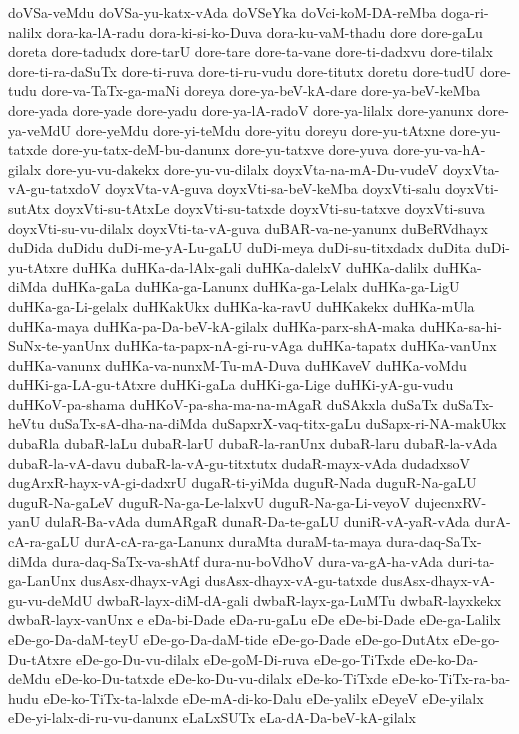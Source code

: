 {doVSa-veMdu
doVSa-yu-katx-vAda
doVSeYka
doVci-koM-DA-reMba
doga-ri-nalilx
dora-ka-lA-radu
dora-ki-si-ko-Duva
dora-ku-vaM-thadu
dore
dore-gaLu
doreta
dore-tadudx
dore-tarU
dore-tare
dore-ta-vane
dore-ti-dadxvu
dore-tilalx
dore-ti-ra-daSuTx
dore-ti-ruva
dore-ti-ru-vudu
dore-titutx
doretu
dore-tudU
dore-tudu
dore-va-TaTx-ga-maNi
doreya
dore-ya-beV-kA-dare
dore-ya-beV-keMba
dore-yada
dore-yade
dore-yadu
dore-ya-lA-radoV
dore-ya-lilalx
dore-yanunx
dore-ya-veMdU
dore-yeMdu
dore-yi-teMdu
dore-yitu
doreyu
dore-yu-tAtxne
dore-yu-tatxde
dore-yu-tatx-deM-bu-danunx
dore-yu-tatxve
dore-yuva
dore-yu-va-hA-gilalx
dore-yu-vu-dakekx
dore-yu-vu-dilalx
doyxVta-na-mA-Du-vudeV
doyxVta-vA-gu-tatxdoV
doyxVta-vA-guva
doyxVti-sa-beV-keMba
doyxVti-salu
doyxVti-sutAtx
doyxVti-su-tAtxLe
doyxVti-su-tatxde
doyxVti-su-tatxve
doyxVti-suva
doyxVti-su-vu-dilalx
doyxVti-ta-vA-guva
duBAR-va-ne-yanunx
duBeRVdhayx
duDida
duDidu
duDi-me-yA-Lu-gaLU
duDi-meya
duDi-su-titxdadx
duDita
duDi-yu-tAtxre
duHKa
duHKa-da-lAlx-gali
duHKa-dalelxV
duHKa-dalilx
duHKa-diMda
duHKa-gaLa
duHKa-ga-Lanunx
duHKa-ga-Lelalx
duHKa-ga-LigU
duHKa-ga-Li-gelalx
duHKakUkx
duHKa-ka-ravU
duHKakekx
duHKa-mUla
duHKa-maya
duHKa-pa-Da-beV-kA-gilalx
duHKa-parx-shA-maka
duHKa-sa-hi-SuNx-te-yanUnx
duHKa-ta-papx-nA-gi-ru-vAga
duHKa-tapatx
duHKa-vanUnx
duHKa-vanunx
duHKa-va-nunxM-Tu-mA-Duva
duHKaveV
duHKa-voMdu
duHKi-ga-LA-gu-tAtxre
duHKi-gaLa
duHKi-ga-Lige
duHKi-yA-gu-vudu
duHKoV-pa-shama
duHKoV-pa-sha-ma-na-mAgaR
duSAkxla
duSaTx
duSaTx-heVtu
duSaTx-sA-dha-na-diMda
duSapxrX-vaq-titx-gaLu
duSapx-ri-NA-makUkx
dubaRla
dubaR-laLu
dubaR-larU
dubaR-la-ranUnx
dubaR-laru
dubaR-la-vAda
dubaR-la-vA-davu
dubaR-la-vA-gu-titxtutx
dudaR-mayx-vAda
dudadxsoV
dugArxR-hayx-vA-gi-dadxrU
dugaR-ti-yiMda
duguR-Nada
duguR-Na-gaLU
duguR-Na-gaLeV
duguR-Na-ga-Le-lalxvU
duguR-Na-ga-Li-veyoV
dujecnxRV-yanU
dulaR-Ba-vAda
dumARgaR
dunaR-Da-te-gaLU
duniR-vA-yaR-vAda
durA-cA-ra-gaLU
durA-cA-ra-ga-Lanunx
duraMta
duraM-ta-maya
dura-daq-SaTx-diMda
dura-daq-SaTx-va-shAtf
dura-nu-boVdhoV
dura-va-gA-ha-vAda
duri-ta-ga-LanUnx
dusAsx-dhayx-vAgi
dusAsx-dhayx-vA-gu-tatxde
dusAsx-dhayx-vA-gu-vu-deMdU
dwbaR-layx-diM-dA-gali
dwbaR-layx-ga-LuMTu
dwbaR-layxkekx
dwbaR-layx-vanUnx
e
eDa-bi-Dade
eDa-ru-gaLu
eDe
eDe-bi-Dade
eDe-ga-Lalilx
eDe-go-Da-daM-teyU
eDe-go-Da-daM-tide
eDe-go-Dade
eDe-go-DutAtx
eDe-go-Du-tAtxre
eDe-go-Du-vu-dilalx
eDe-goM-Di-ruva
eDe-go-TiTxde
eDe-ko-Da-deMdu
eDe-ko-Du-tatxde
eDe-ko-Du-vu-dilalx
eDe-ko-TiTxde
eDe-ko-TiTx-ra-ba-hudu
eDe-ko-TiTx-ta-lalxde
eDe-mA-di-ko-Dalu
eDe-yalilx
eDeyeV
eDe-yilalx
eDe-yi-lalx-di-ru-vu-danunx
eLaLxSUTx
eLa-dA-Da-beV-kA-gilalx
}
